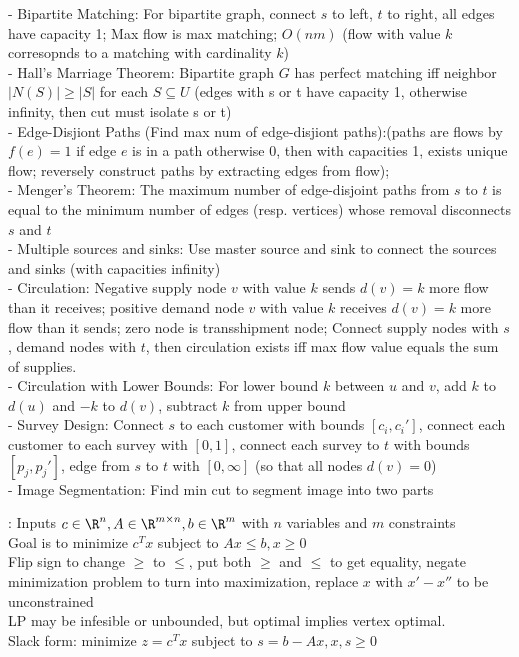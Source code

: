 \documentclass[10pt]{CheatSheet/hw}
\begin{document}
\begin{multicols*}{5}
- Bipartite Matching: For bipartite graph, connect $s$ to left, $t$ to right, all edges have capacity 1; Max flow is max matching; $O(nm)$ (flow with value $k$ corresopnds to a matching with cardinality $k$)\\
- Hall's Marriage Theorem: Bipartite graph $G$ has perfect matching iff neighbor $|N(S)|\ge|S|$ for each $S\subseteq U$ (edges with s or t have capacity 1, otherwise infinity, then cut must isolate s or t)\\
- Edge-Disjiont Paths (Find max num of edge-disjiont paths):(paths are flows by $f(e)=1$ if edge $e$ is in a path otherwise 0, then with capacities 1, exists unique flow; reversely construct paths by extracting edges from flow); \\ 
- Menger's Theorem: The maximum number of edge-disjoint paths from $s$ to $t$ is equal to the minimum number of edges (resp. vertices) whose removal disconnects $s$ and $t$\\
- Multiple sources and sinks: Use master source and sink to connect the sources and sinks (with capacities infinity)\\
- Circulation: Negative supply node $v$ with value $k$ sends $d(v)=k$ more flow than it receives; positive demand node $v$ with value $k$ receives $d(v)=k$ more flow than it sends; zero node is transshipment node; Connect supply nodes with $s$, demand nodes with $t$, then circulation exists iff max flow value equals the sum of supplies.\\
- Circulation with Lower Bounds: For lower bound $k$ between $u$ and $v$, add $k$ to $d(u)$ and $-k$ to $d(v)$, subtract $k$ from upper bound\\
- Survey Design: Connect $s$ to each customer with bounds $[c_i,c_i']$, connect each customer to each survey with $[0,1]$, connect each survey to $t$ with bounds $[p_j,p_j']$, edge from $s$ to $t$ with $[0,\infty]$ (so that all nodes $d(v)=0$)\\
- Image Segmentation: Find min cut to segment image into two parts

: Inputs $c\in\R^n, A\in\R^{m\times n}, b\in\R^m$ with $n$ variables and $m$ constraints\\
Goal is to minimize $c^Tx$ subject to $Ax\le b, x\ge 0$\\
Flip sign to change $\ge$ to $\le$, put both $\ge$ and $\le$ to get equality, negate minimization problem to turn into maximization, replace $x$ with $x'-x''$ to be unconstrained\\
LP may be infesible or unbounded, but optimal implies vertex optimal.\\
Slack form: minimize $z=c^Tx$ subject to $s=b-Ax, x,s\ge0$


\end{multicols*}
\end{document}
